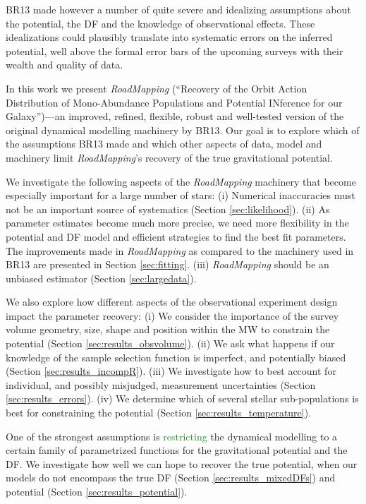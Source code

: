 \documentclass[iop,revtex4]{emulateapj}
\newcommand{\RM}{{\sl RoadMapping}}
\newcommand{\NEW}[1]{\textcolor{ForestGreen}{#1}}
\newcommand{\OLD}[1]{}
\begin{document}
BR13 made however a number of quite severe and idealizing assumptions about the potential, the DF and the knowledge of observational effects. These idealizations could plausibly translate into systematic errors on the inferred potential, well above the formal error bars of the upcoming surveys with their wealth and quality of data.

In this work we present \RM{} (``\textsc{R}ecovery of the \textsc{O}rbit \textsc{A}ction \textsc{D}istribution of \textsc{M}ono-\textsc{A}bundance \textsc{P}opulations and \textsc{P}otential \textsc{IN}ference for our \textsc{G}alaxy'')---an improved, refined, flexible, robust and well-tested version of the original dynamical modelling machinery by BR13. Our goal is to explore which of the assumptions BR13 made and which other aspects of data, model and machinery limit \RM{}'s recovery of the true gravitational potential.

We investigate the following aspects of the \RM{} machinery that become especially important for a large number of stars: (i) Numerical inaccuracies must not be an important source of systematics (Section \ref{sec:likelihood}). (ii) As parameter estimates become much more precise, we need more flexibility in the potential and DF model and efficient strategies to find the best fit parameters. The improvements made in \RM{} as compared to the machinery used in BR13 are presented in Section \ref{sec:fitting}. (iii) \RM{} should be an unbiased estimator (Section \ref{sec:largedata}).

We also explore how different aspects of the observational experiment design impact the parameter recovery: (i) We consider the importance of the survey volume geometry, size, shape and position within the MW to constrain the potential (Section \ref{sec:results_obsvolume}). (ii) We ask what happens if our knowledge of the sample selection function is imperfect, and potentially biased (Section \ref{sec:results_incompR}). (iii) We investigate how to best account for individual, and possibly misjudged, measurement uncertainties (Section \ref{sec:results_errors}). (iv) We determine which of several stellar sub-populations is best for constraining the potential (Section \ref{sec:results_temperature}). 

One of the strongest assumptions is \OLD{to restrict}\NEW{restricting} the dynamical modelling to a certain family of parametrized functions for the gravitational potential and the DF. We investigate how well we can hope to recover the true potential, when our models do not encompass the true DF (Section \ref{sec:results_mixedDFs}) and potential (Section \ref{sec:results_potential}).
\end{document}
